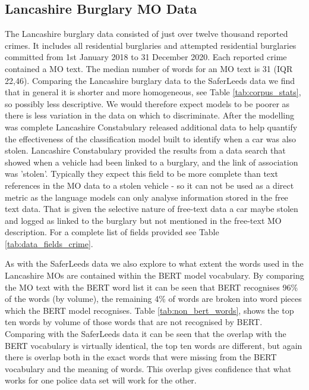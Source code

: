 


\subsection{Lancashire Burglary MO Data} The Lancashire burglary data consisted of just over twelve thousand reported crimes. It includes all residential burglaries and attempted residential burglaries committed from 1st January 2018 to 31 December 2020. Each reported crime contained a MO text. The median number of words for an MO text is 31 (IQR 22,46). Comparing the Lancashire burglary data to the SaferLeeds data we find that in general it is shorter and more homogeneous, see Table \ref{tab:corpus_stats}, so possibly less descriptive. We would therefore expect models to be poorer as there is less variation in the data on which to discriminate. After the modelling was complete Lancashire Constabulary released additional data to help quantify the effectiveness of the classification model built to identify when a car was also stolen. Lancashire Constabulary provided the results from a data search that showed when a vehicle had been linked to a burglary, and the link of association was 'stolen'. Typically they expect this field to be more complete than text references in the MO data to a stolen vehicle - so it can not be used as a direct metric as the language models can only analyse information stored in the free text data. That is given the selective nature of free-text data a car maybe stolen and logged as linked to the burglary but not mentioned in the free-text MO description. For a complete list of fields provided see Table \ref{tab:data_fields_crime}.

As with the SaferLeeds data we also explore to what extent the words used in the Lancashire MOs are contained within the BERT model vocabulary. By comparing the MO text with the BERT word list it can be seen that BERT recognises 96\% of the words (by volume), the remaining 4\% of words are broken into word pieces which the BERT model recognises. Table \ref{tab:non_bert_words}, shows the top ten words by volume of those words that are not recognised by BERT. Comparing with the SaferLeeds data it can be seen that the overlap with the BERT vocabulary is virtually identical, the top ten words are different, but again there is overlap both in the exact words that were missing from the BERT vocabulary and the meaning of words. This overlap gives confidence that what works for one police data set will work for the other. 

